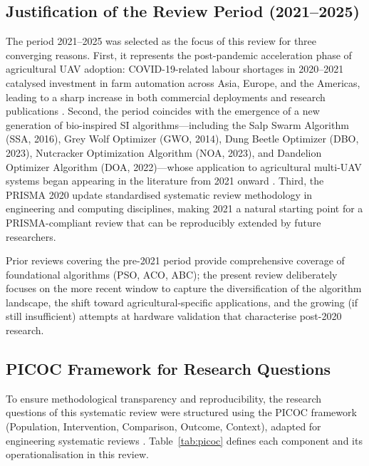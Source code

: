 \documentclass[review,3p,times]{elsarticle}
\begin{document}
\subsection{Justification of the Review Period (2021--2025)}

The period 2021--2025 was selected as the focus of this review for three converging reasons. First, it represents the post-pandemic acceleration phase of agricultural UAV adoption: COVID-19-related labour shortages in 2020--2021 catalysed investment in farm automation across Asia, Europe, and the Americas, leading to a sharp increase in both commercial deployments and research publications \cite{tsouros2019,mogili2018}. Second, the period coincides with the emergence of a new generation of bio-inspired SI algorithms---including the Salp Swarm Algorithm (SSA, 2016), Grey Wolf Optimizer (GWO, 2014), Dung Beetle Optimizer (DBO, 2023), Nutcracker Optimization Algorithm (NOA, 2023), and Dandelion Optimizer Algorithm (DOA, 2022)---whose application to agricultural multi-UAV systems began appearing in the literature from 2021 onward \cite{li2023,xiao2025}. Third, the PRISMA 2020 update \cite{page2021} standardised systematic review methodology in engineering and computing disciplines, making 2021 a natural starting point for a PRISMA-compliant review that can be reproducibly extended by future researchers.

Prior reviews covering the pre-2021 period \cite{chung2018,puente2022,sharma2022,aitsaadi2022} provide comprehensive coverage of foundational algorithms (PSO, ACO, ABC); the present review deliberately focuses on the more recent window to capture the diversification of the algorithm landscape, the shift toward agricultural-specific applications, and the growing (if still insufficient) attempts at hardware validation that characterise post-2020 research.

\subsection{PICOC Framework for Research Questions}
\label{subsec:picoc}

To ensure methodological transparency and reproducibility, the research questions of this systematic review were structured using the PICOC framework (Population, Intervention, Comparison, Outcome, Context), adapted for engineering systematic reviews \cite{brambilla2013,bayindir2016}. Table~\ref{tab:picoc} defines each component and its operationalisation in this review.
\end{document}
